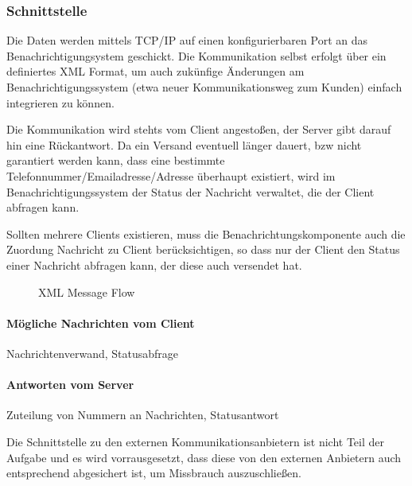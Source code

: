\documentclass[12pt,a4paper,titlepage,oneside]{scrartcl}
\begin{document}
\subsubsection{Schnittstelle}
Die Daten werden mittels TCP/IP auf einen konfigurierbaren Port an das Benachrichtigungsystem geschickt. Die Kommunikation selbst erfolgt über ein definiertes XML Format, um auch zukünfige Änderungen am Benachrichtigungssystem (etwa neuer Kommunikationsweg zum Kunden) einfach integrieren zu können.

Die Kommunikation wird stehts vom Client angestoßen, der Server gibt darauf hin eine Rückantwort. Da ein Versand eventuell länger dauert, bzw nicht garantiert werden kann, dass eine bestimmte Telefonnummer/Emailadresse/Adresse überhaupt existiert, wird im Benachrichtigungssystem der Status der Nachricht verwaltet, die der Client abfragen kann.

Sollten mehrere Clients existieren, muss die Benachrichtungskomponente auch die Zuordung Nachricht zu Client berücksichtigen, so dass nur der Client den Status einer Nachricht abfragen kann, der diese auch versendet hat.

\begin{figure}
\centering
	\caption{XML Message Flow}
\end{figure}

\paragraph{Mögliche Nachrichten vom Client} Nachrichtenverwand, Statusabfrage
\paragraph{Antworten vom Server} Zuteilung von Nummern an Nachrichten, Statusantwort

Die Schnittstelle zu den externen Kommunikationsanbietern ist nicht Teil der Aufgabe und es wird vorrausgesetzt, dass diese von den externen Anbietern auch entsprechend abgesichert ist, um Missbrauch auszuschließen.
\end{document}
